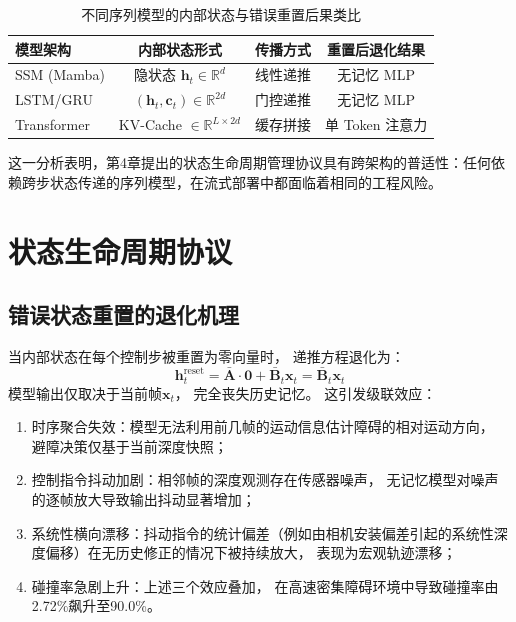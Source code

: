 \begin{table}[htbp]
\centering
\caption{不同序列模型的内部状态与错误重置后果类比}
\label{tab:state_analogy}
\begin{tabular}{lccc}
\toprule
\textbf{模型架构} & \textbf{内部状态形式} & \textbf{传播方式} & \textbf{重置后退化结果} \\
\midrule
SSM (Mamba) & 隐状态 $\mathbf{h}_t \in \mathbb{R}^{d}$ & 线性递推 & 无记忆 MLP \\
LSTM/GRU & $(\mathbf{h}_t, \mathbf{c}_t) \in \mathbb{R}^{2d}$ & 门控递推 & 无记忆 MLP \\
Transformer & KV-Cache $\in \mathbb{R}^{L \times 2d}$ & 缓存拼接 & 单 Token 注意力 \\
\bottomrule
\end{tabular}
\end{table}

这一分析表明，第4章提出的状态生命周期管理协议具有跨架构的普适性：任何依赖跨步状态传递的序列模型，在流式部署中都面临着相同的工程风险。


\section{状态生命周期协议}

\subsection{错误状态重置的退化机理}

当内部状态在每个控制步被重置为零向量时，
递推方程退化为：
\begin{equation}
  \mathbf{h}_t^{\text{reset}} = \bar{\mathbf{A}} \cdot \mathbf{0} + \bar{\mathbf{B}}_t \mathbf{x}_t = \bar{\mathbf{B}}_t \mathbf{x}_t
  \label{eq:reset_degenerate_ch4}
\end{equation}
模型输出仅取决于当前帧$\mathbf{x}_t$，
完全丧失历史记忆。
这引发级联效应：

\begin{enumerate}
  \item 时序聚合失效：模型无法利用前几帧的运动信息估计障碍的相对运动方向，
    避障决策仅基于当前深度快照；
     \item 控制指令抖动加剧：相邻帧的深度观测存在传感器噪声，
    无记忆模型对噪声的逐帧放大导致输出抖动显著增加；
     \item 系统性横向漂移：抖动指令的统计偏差（例如由相机安装偏差引起的系统性深度偏移）在无历史修正的情况下被持续放大，
    表现为宏观轨迹漂移；
     \item 碰撞率急剧上升：上述三个效应叠加，
    在高速密集障碍环境中导致碰撞率由2.72\%飙升至90.0\%。
     \end{enumerate}

